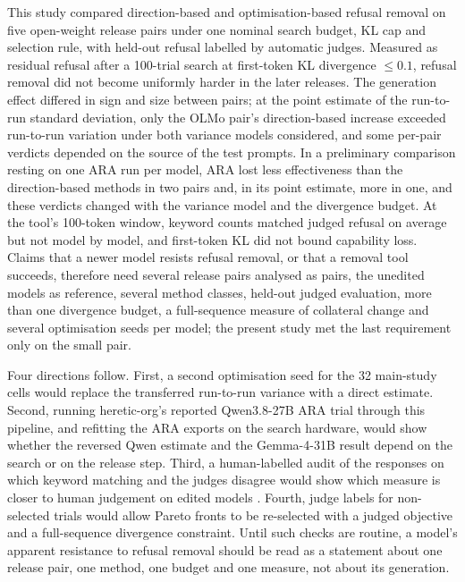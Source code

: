 This study compared direction-based and optimisation-based refusal removal on
five open-weight release pairs under one nominal search budget, KL cap and
selection rule, with held-out refusal labelled by automatic judges. Measured
as residual refusal after a 100-trial search at first-token KL divergence
$\le 0.1$, refusal removal did not become uniformly harder in the later
releases. The generation effect differed in sign and size between pairs; at
the point estimate of the run-to-run standard deviation, only the OLMo pair's
direction-based increase exceeded run-to-run variation under both variance
models considered, and some per-pair verdicts depended on the
source of the test prompts. In a preliminary comparison resting on one ARA run
per model, ARA lost less effectiveness than the direction-based methods in two
pairs and, in its point estimate, more in one, and these verdicts changed with the variance model and
the divergence budget. At the tool's 100-token window, keyword counts matched
judged refusal on average but not model by model, and first-token KL did not
bound capability loss. Claims that a newer model resists refusal removal, or
that a removal tool succeeds, therefore need several release pairs analysed as
pairs, the unedited models as reference, several method classes, held-out
judged evaluation, more than one divergence budget, a full-sequence measure of
collateral change and several optimisation seeds per model; the present study
met the last requirement only on the small pair.

Four directions follow. First, a second optimisation seed for the 32
main-study cells would replace the transferred run-to-run variance with a
direct estimate. Second, running heretic-org's reported Qwen3.8-27B ARA trial
through this pipeline, and refitting the ARA exports on the search hardware,
would show whether the reversed Qwen estimate and the Gemma-4-31B result depend on the
search or on the release step. Third, a human-labelled audit of the responses
on which keyword matching and the judges disagree would show which measure is
closer to human judgement on edited models \cite{gao2026how}. Fourth, judge
labels for non-selected trials would allow Pareto fronts to be re-selected
with a judged objective and a full-sequence divergence constraint. Until such
checks are routine, a model's apparent resistance to refusal removal should be
read as a statement about one release pair, one method, one budget and one
measure, not about its generation.
